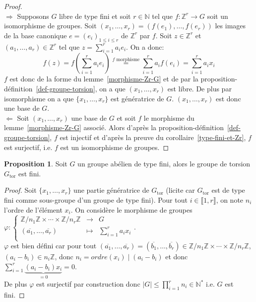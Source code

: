 \documentclass{article}
\newcommand{\Z}{\mathbb{Z}}
\newcommand{\N}{\mathbb{N}}
\newcommand{\Gt}{G_{\mathrm{tor}}}
\newcommand{\dis}{\displaystyle}
\newcommand{\nt}[1]{\llbracket  #1 \rrbracket }
\theoremstyle{definition}
\newtheorem{prop}[defi]{Proposition}
\theoremstyle{remark}
\newcommand{\app}[5]{#1:\left\{\begin{array}{rcl}
#2 & \longrightarrow & #3 \\
#4 & \longmapsto & #5  \\
\end{array}\right.
}
\begin{document}
\begin{proof}\hspace{.1em}\\
\underline{$\Rightarrow$} Supposons $G$ libre de type fini et soit $r\in\N$ tel que $f:\Z^r\to G$ soit un isomorphisme de groupes. Soit $(x_1, \ldots ,x_r)=(f(e_1),\ldots, f(e_r))$ les images de la base canonique $e=(e_i)_{1\leqslant i\leqslant r}$ de $\Z^r$ par $f$. Soit $z\in\Z^r$ et $(a_1,\ldots,a_r)\in\Z^r$ tel que $z=\dis\sum_{i=1}^r a_ie_i$. On a donc:
$$f(z)=f(\dis\sum_{i=1}^r a_i e_i)\stackrel{\textrm{$f$ morphisme}}{=}\dis\sum_{i=  1}^r a_if(e_i)=\dis\sum_{i=  1}^r a_ix_i$$
$f$ est donc de la forme du lemme~\ref{morphisme-Zr-G} et de par la proposition-d\'efinition~\ref{def-groupe-torsion}, on a que $(x_1, \ldots ,x_r)$ est libre. De plus par isomorphisme on a que $\{x_1, \ldots ,x_r\}$ est génératrice de $G$. $(x_1, \ldots ,x_r)$ est donc une base de $G$.\\
\underline{$\Leftarrow$} Soit $(x_1, \ldots ,x_r)$ une base de $G$ et soit $f$ le morphisme du lemme~\ref{morphisme-Zr-G} associ\'e. Alors d'apr\`es la proposition-d\'efinition~\ref{def-groupe-torsion}, $f$ est injectif et d'apr\`es la preuve du corollaire~\ref{type-fini-et-Zr}, $f$ est surjectif, i.e. $f$ est un isomorphisme de groupes.
\end{proof}

\begin{prop}
Soit $G$ un groupe abélien de type fini, alors le groupe de torsion $\Gt$ est fini.
\end{prop}

\begin{proof}
Soit $\{x_1, \ldots ,x_r\}$ une partie génératrice de $\Gt$ (licite car $\Gt$ est de type fini comme sous-groupe d'un groupe de type fini). Pour tout $i \in \nt{1,r}$, on note $n_i$ l'ordre de l'élément $x_i$. On considère le morphisme de groupes $\app{\varphi}{\Z/n_1\Z \times \cdots \times \Z/n_r\Z}{G}{(\overline{a_1}, \ldots, \overline{a_r})}{\dis \sum_{i=1}^r a_ix_i}$.\\
$\varphi$ est bien défini car pour tout $(\overline{a_1}, \ldots, \overline{a_r})=(\overline{b_1}, \ldots, \overline{b_r}) \in \Z/n_1\Z \times \cdots \times \Z/n_r\Z$, $(a_i-b_i)\in n_i\Z$, donc $n_i=ordre(x_i)\mid (a_i-b_i)$ et donc $\dis \sum_{i=1}^r \underbrace{(a_i-b_i)x_i}_{=0}=0$.\\
De plus $\varphi$ est surjectif par construction  donc $\vert G \vert \leqslant \dis \prod_{i=1}^r n_i \in \N^*$ i.e. $G$ est fini.
\end{proof}
\end{document}
